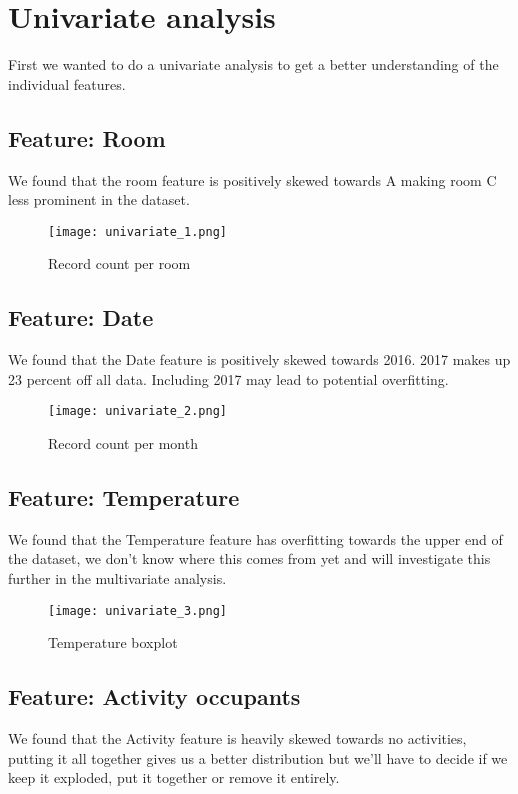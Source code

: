 \documentclass[]{article}
\begin{document}
\section{Univariate analysis}
First we wanted to do a univariate analysis to get a better understanding of the individual features.

\subsection{Feature: Room}
We found that the room feature is positively skewed towards A making room C less prominent in the dataset.
\begin{figure}[H]
	\centering
	\texttt{[image: univariate\_1.png]}
	\caption{Record count per room}
\end{figure}

\subsection{Feature: Date}
We found that the Date feature is positively skewed towards 2016. 2017 makes up 23 percent off all data. Including 2017 may lead to potential overfitting.


\begin{figure}[H]
	\centering
	\texttt{[image: univariate\_2.png]}
	\caption{Record count per month}
\end{figure}



\subsection{Feature: Temperature}
We found that the Temperature feature has overfitting towards the upper end of the dataset, we don't know where this comes from yet and will investigate this further in the multivariate analysis.

\begin{figure}[H]
	\centering
	\texttt{[image: univariate\_3.png]}
	\caption{Temperature boxplot}
\end{figure}

\subsection{Feature: Activity occupants}
We found that the Activity feature is heavily skewed towards no activities, putting it all together gives us a better distribution but we'll have to decide if we keep it exploded, put it together or remove it entirely.
\end{document}
